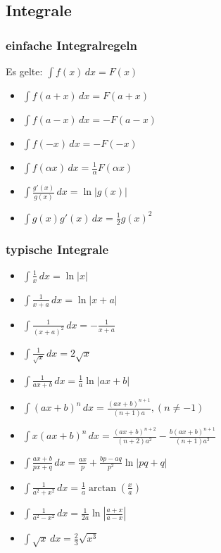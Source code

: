 \subsection{Integrale}
\subsubsection{einfache Integralregeln}
Es gelte: $\int f(x) \, dx = F(x)$
\begin{itemize}[leftmargin=*]
	\item $\int f(a + x) \,dx = F(a + x)$
	\item $\int f(a - x) \,dx = -F(a-x)$
	\item $\int f(-x) \,dx = -F(-x)$
	\item $\int f(\alpha x) \,dx = \frac{1}{\alpha}F(\alpha x)$
	\item $\int \frac{g'(x)}{g(x)} \, dx = \ln|g(x)|$
	\item $\int g(x)g'(x) \, dx = \frac{1}{2}g(x)^2$
\end{itemize}
\subsubsection{typische Integrale}
\begin{itemize}[leftmargin=*]
  	\item $\int \frac{1}{x} \,dx = \ln |x|$
  	\item $\int \frac{1}{x+a} \,dx = \ln |x+a|$
  	\item $\int \frac{1}{(x+a)^2} \,dx = - \frac{1}{x+a}$
  	\item $\int \frac{1}{\sqrt{x}} \,dx = 2 \sqrt{x}$
	\item $\int \frac{1}{ax+b} \,dx = \frac{1}{a} \ln |ax+b|$
	\item $\int(ax + b)^n \,dx = \frac{(ax + b)^{n+1}}{(n + 1)a}, (n \neq -1)$
	\item $\int x(ax+b)^n \,dx = \frac{(ax + b)^{n+2}}{(n+2)a^2} -
	\frac{b(ax+b)^{n+1}}{(n+1)a^2}$
	\item $\int \frac{ax + b}{px + q} \,dx = \frac{ax}{p} + \frac{bp - aq}{p^2} \ln
	|pq+q|$
	\item $\int \frac{1}{a^2 + x^2} \,dx = \frac{1}{a} \arctan(\frac{x}{a})$
	\item $\int \frac{1}{a^2 - x^2} \,dx = \frac{1}{2a} \ln \left | \frac{a+x}{a-x}
	\right |$
	\item $\int \sqrt{x} \,dx = \frac{2}{3}\sqrt{x^3}$
\end{itemize}

